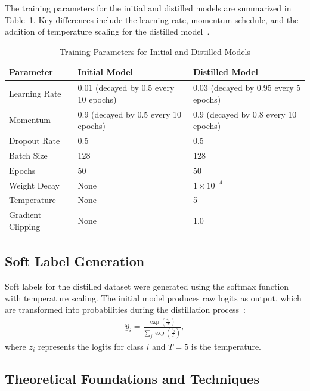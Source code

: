 \documentclass[a4paper, 11pt]{article}
\begin{document}
The training parameters for the initial and distilled models are summarized in Table~\ref{tab:training_params}. Key differences include the learning rate, momentum schedule, and the addition of temperature scaling for the distilled model~\cite{papernot2016distillation}.

\begin{table}[H]
    \centering
    \caption{Training Parameters for Initial and Distilled Models}
    \label{tab:training_params}
    \begin{tabular}{@{}lll@{}}
        \toprule
        \textbf{Parameter} & \textbf{Initial Model} & \textbf{Distilled Model} \\
        \midrule
        Learning Rate       & 0.01 (decayed by 0.5 every 10 epochs) & 0.03 (decayed by 0.95 every 5 epochs) \\
        Momentum            & 0.9 (decayed by 0.5 every 10 epochs) & 0.9 (decayed by 0.8 every 10 epochs) \\
        Dropout Rate        & 0.5 & 0.5 \\
        Batch Size          & 128 & 128 \\
        Epochs              & 50 & 50 \\
        Weight Decay        & None & $1 \times 10^{-4}$ \\
        Temperature         & None & 5 \\
        Gradient Clipping   & None & 1.0 \\
        \bottomrule
    \end{tabular}
\end{table}

\subsection{Soft Label Generation}

Soft labels for the distilled dataset were generated using the softmax function with temperature scaling. The initial model produces raw logits as output, which are transformed into probabilities during the distillation process~\cite{papernot2016distillation}:
\begin{align*}
    \hat{y}_i = \frac{\exp\left(\frac{z_i}{T}\right)}{\sum_j \exp\left(\frac{z_j}{T}\right)},
\end{align*}
where $z_i$ represents the logits for class $i$ and $T = 5$ is the temperature.

\subsection{Theoretical Foundations and Techniques}
\end{document}
